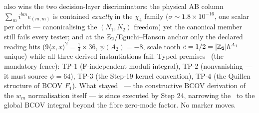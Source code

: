 also wins the two decision-layer discriminators: the physical AB column $\sum_mi^{bm}e_{(m,m)}$
is contained \emph{exactly} in the $\chi_4$ family ($\sigma\sim1.8\times10^{-16}$, one scalar
per orbit --- canonicalising the $(N_1,N_2)$ freedom) yet the canonical member still fails
every tester; and at the $\mathbb{Z}_2$/Eguchi--Hanson anchor only the declared reading hits
($9\langle x,x\rangle^2=\tfrac14\times36$, $\psi(A_2)=-8$, scale tooth $c=1/2=|\mathbb{Z}_2|h^{A_1}$
unique) while all three derived instantiations fail. Typed premises \mC\ (the mandatory fence):
TP-1 (F-independent moduli integral), TP-2 (nonvanishing --- it must source $\psi=64$), TP-3
(the Step-19 kernel convention), TP-4 (the Quillen structure of BCOV $F_1$). What stayed \mO\
--- the constructive BCOV derivation of the $w_m$ normalisation itself --- is since executed
by Step 24, narrowing the \mO\ to the global BCOV integral beyond the fibre zero-mode factor.
No marker moves.

